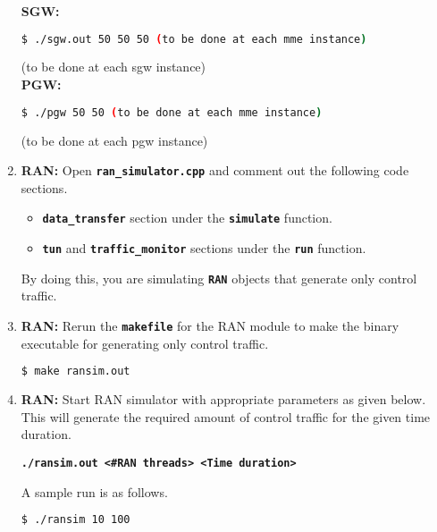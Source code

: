\pdfminorversion=4\documentclass[hidelinks]{report}
\newcommand{\cf}[1] {
	\textbf{\texttt{#1}}
}
\begin{document}
\begin{enumerate}
\textbf{SGW:}
\begin{lstlisting}[language=bash]
$ ./sgw.out 50 50 50 (to be done at each mme instance)
\end{lstlisting}
(to be done at each sgw instance)\\
\textbf{PGW:}
\begin{lstlisting}[language=bash]
$ ./pgw 50 50 (to be done at each mme instance)
\end{lstlisting}
(to be done at each pgw instance)\\
\item \textbf{RAN:} Open \cf{ran\_simulator.cpp} and comment out the following code sections.

\begin{itemize}

\item \cf{data\_transfer} section under the \cf{simulate} function.

\item \cf{tun} and \cf{traffic\_monitor} sections under the \cf{run} function.

\end{itemize}

By doing this, you are simulating \cf{RAN} objects that generate only control traffic.

\item \textbf{RAN:} Rerun the \cf{makefile} for the RAN module to make the binary executable for generating only control traffic.

\begin{lstlisting}[language=bash]
$ make ransim.out
\end{lstlisting}

\item \textbf{RAN:} Start RAN simulator with appropriate parameters as given below. This will generate the required amount of control traffic for the given time duration.

\begin{center}

\cf{./ransim.out <\#RAN threads> <Time duration>}

\end{center}

A sample run is as follows.

\begin{lstlisting}[language=bash]
$ ./ransim 10 100
\end{lstlisting}

\end{enumerate}
\end{document}
